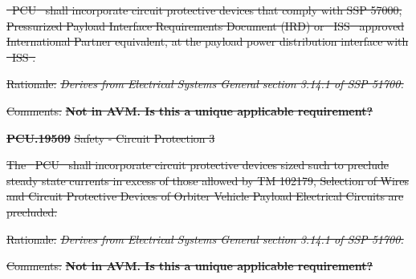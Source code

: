 \documentclass[12pt,oneside,oldfontcommands]{memoir}
\providecommand{\DIFdeltex}[1]{{\protect\color{red}\sout{#1}}}                      %
\providecommand{\DIFdel}[1]{\texorpdfstring{\DIFdeltex{#1}}{}} %
\begin{document}
\DIFdel{\mbox{%
\gls{PCU} }\hspace{0pt}%
shall incorporate circuit protective devices that comply with SSP 57000, Pressurized Payload Interface Requirements Document (IRD) or \mbox{%
\gls{ISS} }\hspace{0pt}%
approved International Partner equivalent, at the payload power distribution interface with \mbox{%
\gls{ISS}}\hspace{0pt}%
.
}%

\begin{itemize}%
\DIFdel{Rationale: }\emph{\DIFdel{Derives from Electrical Systems General section 3.14.1 of SSP 51700.}}

\DIFdel{Comments: }\textbf{\DIFdel{Not in AVM. Is this a unique applicable requirement?}}


\end{itemize}%

\textbf{%
\DIFdel{PCU.19509}%
} %
\DIFdel{Safety - Circuit Protection 3
}%

\DIFdel{The \mbox{%
\gls{PCU} }\hspace{0pt}%
shall incorporate circuit protective devices sized such to preclude steady state currents in excess of those allowed by TM 102179, Selection of Wires and Circuit Protective Devices of Orbiter Vehicle Payload Electrical Circuits are precluded.
}%

\begin{itemize}%
\DIFdel{Rationale: }\emph{\DIFdel{Derives from Electrical Systems General section 3.14.1 of SSP 51700.}}

\DIFdel{Comments: }\textbf{\DIFdel{Not in AVM. Is this a unique applicable requirement?}}


\end{itemize}%
\end{document}
